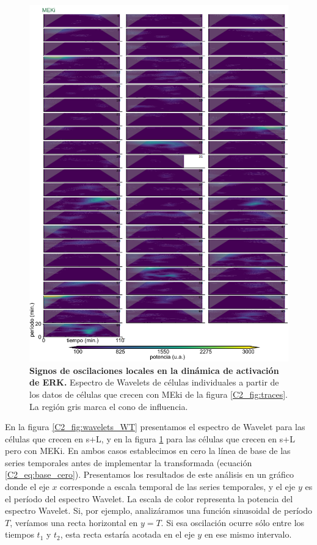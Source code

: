 \documentclass[./main.tex]{subfiles}
\begin{document}
 \begin{figure}
    \centering
    \includegraphics[width=1\textwidth]{figures/chapter2/C2_wavelets_MEKi.pdf}\caption{\textbf{Signos de oscilaciones locales en la dinámica de activación de ERK.} Espectro de Wavelets de células individuales a partir de los datos de células que crecen con MEki de la figura \ref{C2_fig:traces}. La región gris marca el cono de influencia.}
    \label{C2_fig:wavelets_MEKI}
\end{figure}


En la figura \ref{C2_fig:wavelets_WT} presentamos el espectro de Wavelet para las células que crecen en s+L, y en la figura \ref{C2_fig:wavelets_MEKI} para las células que crecen en s+L pero con MEKi. En ambos casos establecimos en cero la línea de base de las series temporales antes de implementar la transformada (ecuación \ref{C2_eq:base_cero}). Presentamos los resultados de este análisis en un gráfico donde el eje $x$ corresponde a escala temporal de las series temporales, y el eje $y$ es el período del espectro Wavelet. La escala de color representa la potencia del espectro Wavelet. Si, por ejemplo, analizáramos una función sinusoidal de período $T$, veríamos una recta horizontal en $y = T$. Si esa oscilación ocurre sólo entre los tiempos $t_1$ y $t_2$, esta recta estaría acotada en el eje $y$ en ese mismo intervalo.   
\end{document}
